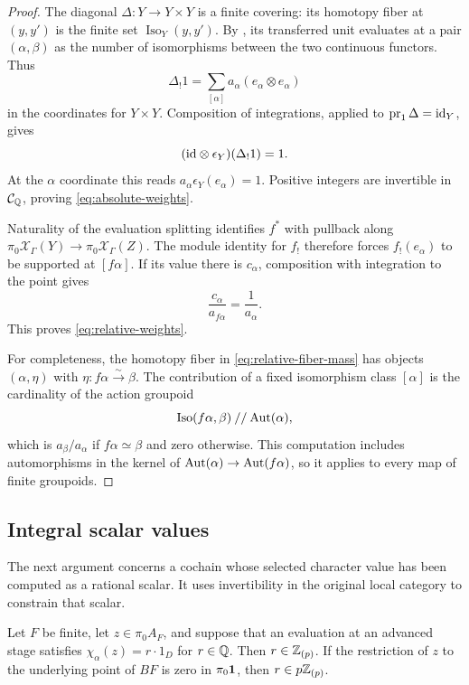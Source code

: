 \begin{proof}
The diagonal $\Delta:Y\to Y\times Y$ is a finite covering: its homotopy fiber
at $(y,y')$ is the finite set $\operatorname{Iso}_Y(y,y')$.
By , its transferred unit evaluates at a pair
$(\alpha,\beta)$ as the number of isomorphisms between the two continuous
functors.  Thus
\[
 \Delta_!1=\sum_{[\alpha]}a_\alpha(e_\alpha\otimes e_\alpha)
\]
in the coordinates for $Y\times Y$.  Composition of integrations, applied to
$\operatorname{pr}_1\Delta=\mathrm{id}_Y$, gives
\[
 (\mathrm{id}\otimes\epsilon_Y)(\Delta_!1)=1.
\]
At the $\alpha$ coordinate this reads
$a_\alpha\epsilon_Y(e_\alpha)=1$.  Positive integers are invertible in
$\mathcal C_{\mathbb Q}$, proving \eqref{eq:absolute-weights}.

Naturality of the evaluation splitting identifies $f^*$ with pullback along
$\pi_0\mathcal X_\Gamma(Y)\to\pi_0\mathcal X_\Gamma(Z)$.
The module identity for $f_!$ therefore forces $f_!(e_\alpha)$ to be supported
at $[f\alpha]$.  If its value there is $c_\alpha$, composition with integration
to the point gives
\[
 \frac{c_\alpha}{a_{f\alpha}}=\frac1{a_\alpha}.
\]
This proves \eqref{eq:relative-weights}.

For completeness, the homotopy fiber in \eqref{eq:relative-fiber-mass} has
objects $(\alpha,\eta)$ with $\eta:f\alpha\xrightarrow{\sim}\beta$.
The contribution of a fixed isomorphism class $[\alpha]$ is the cardinality
of the action groupoid
\[
 \operatorname{Iso}(f\alpha,\beta)\mathbin{//}\operatorname{Aut}(\alpha),
\]
which is $a_\beta/a_\alpha$ if $f\alpha\simeq\beta$ and zero otherwise.
This computation includes automorphisms in the kernel of
$\operatorname{Aut}(\alpha)\to\operatorname{Aut}(f\alpha)$, so it applies to every map of finite
groupoids.
\end{proof}

\subsection{Integral scalar values}

The next argument concerns a cochain whose selected character value has been
computed as a rational scalar.  It uses invertibility in the original local
category to constrain that scalar.

\begin{lemma}\label{lem:scalar-integrality}
Let $F$ be finite, let $z\in\pi_0A_F$, and suppose that an evaluation at an
advanced stage satisfies $\chi_\alpha(z)=r\cdot1_D$ for $r\in\mathbb Q$.
Then $r\in\mathbb Z_{(p)}$.  If the restriction of $z$ to the underlying point of
$BF$ is zero in $\pi_0\mathbf1$, then $r\in p\mathbb Z_{(p)}$.
\end{lemma}

